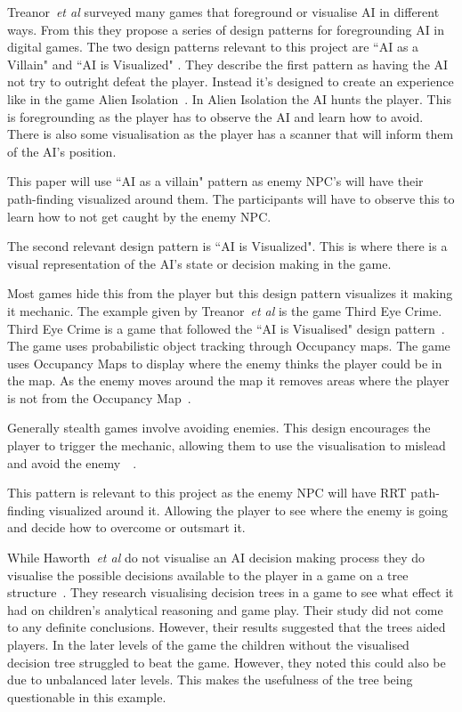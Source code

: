 \documentclass[journal]{IEEEtran}
\begin{document}
Treanor~\textit{et al} surveyed many games that foreground or visualise AI in different ways.    From this they propose a series of design patterns for foregrounding AI in digital games. 
The two design patterns relevant to this project are ``AI as a Villain" and ``AI is Visualized" .  They describe the first pattern as having the AI not try to outright defeat the player. Instead it's designed to create an experience like in the game Alien Isolation~\cite{game:AlienIsolation, treanor2015}.  In Alien Isolation the AI hunts the player. This is foregrounding as the player has to observe the AI and learn how to avoid.  There is also some visualisation as the player has a scanner that will inform them of the AI's position. 

This paper will use ``AI as a villain" pattern as enemy NPC's  will have their path-finding visualized around them. The participants will have to observe this to learn how to not get caught by the enemy NPC.    


The second relevant design pattern is ``AI is Visualized".  This is where there is a visual representation of the AI's state or decision making in the game. 

Most games hide this from the player but this design pattern visualizes it making it mechanic.  
The example given by Treanor~\textit{et al} is the game Third Eye Crime.  Third Eye Crime is a game that followed the ``AI is Visualised" design pattern~\cite{Isla2014, game:ThirdEyeCrime}.  
The game uses probabilistic object tracking through Occupancy maps. The game uses Occupancy Maps to display where the enemy thinks the player could be in the map. As the enemy moves around the map it removes areas where the player is not from the Occupancy Map~\cite{Isla2014}.  

Generally stealth games involve avoiding enemies.  This design encourages the player to trigger the mechanic,  allowing them to use the visualisation to mislead and avoid the enemy~\cite{Isla2014}~\cite{game:ThirdEyeCrime}.  

This pattern is relevant to this project as the enemy NPC will have RRT path-finding visualized around it. Allowing the player to see where the enemy is going and decide how to overcome or outsmart it.

While Haworth~\textit{et al} do not visualise an AI decision making process they do visualise the possible decisions available to the player in a game on a tree structure~\cite{Haworth2010}.   They research visualising decision trees in a game to see what effect it had on children's analytical reasoning and game play.  
Their study did not come to any definite conclusions. However, their results suggested that the trees aided players. In the later levels of the game the children without the visualised decision tree struggled to beat the game.   However, they noted this could also be due to unbalanced later levels.  This makes the usefulness of the tree being questionable in this example.  
\end{document}
